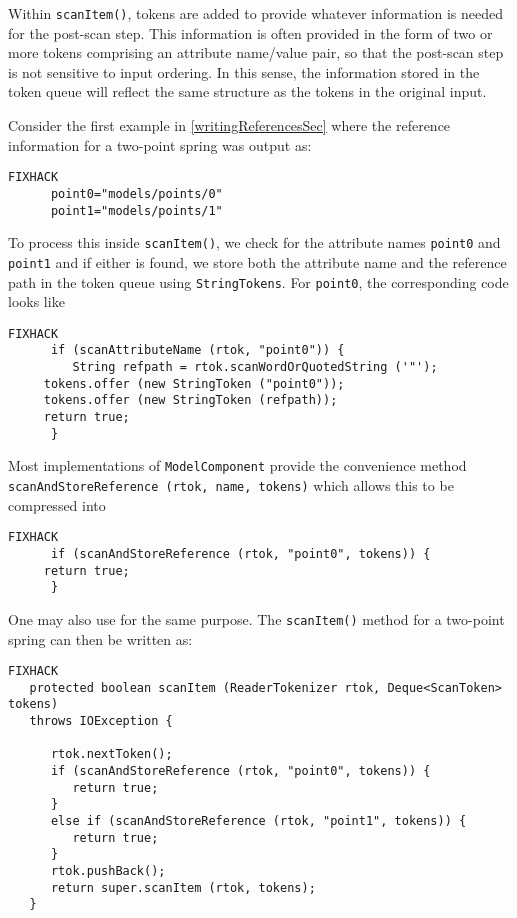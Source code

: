 \documentclass{article}
\begin{document}
Within {\tt scanItem()}, tokens are added to provide whatever
information is needed for the post-scan step.  This information is
often provided in the form of two or more tokens comprising an
attribute name/value pair, so that the post-scan step is not sensitive
to input ordering. In this sense, the information
stored in the token queue will reflect the same structure as the
tokens in the original input.

Consider the first example in \ref{writingReferencesSec}
where the reference information for a two-point spring was output as:
\begin{lstlisting}FIXHACK
      point0="models/points/0"
      point1="models/points/1"
\end{lstlisting}
To process this inside {\tt scanItem()}, we check for the attribute
names {\tt point0} and {\tt point1} and if either is found, we store both
the attribute name and the reference path in the token queue using
{\tt StringTokens}.  For {\tt point0}, the corresponding code
looks like
\begin{lstlisting}FIXHACK
      if (scanAttributeName (rtok, "point0")) {
         String refpath = rtok.scanWordOrQuotedString ('"');
	 tokens.offer (new StringToken ("point0"));
	 tokens.offer (new StringToken (refpath));
	 return true;
      }
\end{lstlisting}
Most implementations of {\tt ModelComponent}
provide the convenience method {\tt scanAndStoreReference (rtok, name, tokens)}
which allows this to be compressed into
\begin{lstlisting}FIXHACK
      if (scanAndStoreReference (rtok, "point0", tokens)) {
	 return true;
      }
\end{lstlisting}
One may also use
for the same purpose.
The {\tt scanItem()} method for a two-point spring can then be written as:
\begin{lstlisting}FIXHACK
   protected boolean scanItem (ReaderTokenizer rtok, Deque<ScanToken> tokens)
   throws IOException {

      rtok.nextToken();
      if (scanAndStoreReference (rtok, "point0", tokens)) {
         return true;
      }
      else if (scanAndStoreReference (rtok, "point1", tokens)) {
         return true;
      }
      rtok.pushBack();
      return super.scanItem (rtok, tokens);
   }
\end{lstlisting}
\end{document}
